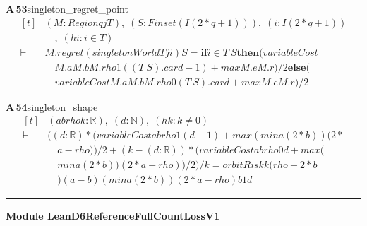 \documentclass[conference]{IEEEtran}
\theoremstyle{definition}
\newcommand{\lean}[1]{\textsf{\footnotesize #1}}
\begin{document}
\noindent\textbf{A\,53}\quad\lean{singleton\_regret\_point}
{\footnotesize\[ \begin{aligned}[t]
&(\mathit{M} : \mathit{Region} \mathit{q} \mathit{j} \mathit{T}),\; (\mathit{S} : \mathit{Finset} (\mathit{I} (2*\mathit{q}+1))),\; (\mathit{i} : \mathit{I} (2*\mathit{q}+1))\\
&\quad ,\; (\mathit{hi} : \mathit{i} \in \mathit{T})\\
\vdash\;&\mathit{M}.\mathit{regret} (\mathit{singletonWorld} \mathit{T} \mathit{j} \mathit{i}) \mathit{S} = \mathbf{if} \mathit{i} \in \mathit{T} \ \mathit{S} \mathbf{then} (\mathit{variableCost}\\
&\quad \mathit{M}.\mathit{a} \mathit{M}.\mathit{b} \mathit{M}.\mathit{rho} 1 ((\mathit{T} \ \mathit{S}).\mathit{card}-1)+\mathit{max} \mathit{M}.\mathit{e} \mathit{M}.\mathit{r})/2 \mathbf{else} (\\
&\quad \mathit{variableCost} \mathit{M}.\mathit{a} \mathit{M}.\mathit{b} \mathit{M}.\mathit{rho} 0 (\mathit{T} \ \mathit{S}).\mathit{card}+\mathit{max} \mathit{M}.\mathit{e} \mathit{M}.\mathit{r})/2
\end{aligned} \]}

\noindent\textbf{A\,54}\quad\lean{singleton\_shape}
{\footnotesize\[ \begin{aligned}[t]
&(\mathit{a} \mathit{b} \mathit{rho} \mathit{k} : \mathbb{R} ),\; (\mathit{d} : \mathbb{N} ),\; (\mathit{hk} : \mathit{k} \neq 0)\\
\vdash\;&((\mathit{d}:\mathbb{R} )*(\mathit{variableCost} \mathit{a} \mathit{b} \mathit{rho} 1 (\mathit{d}-1)+\mathit{max} (\mathit{min} \mathit{a} (2*\mathit{b})) (2*\\
&\quad \mathit{a}-\mathit{rho}))/2+ (\mathit{k}-(\mathit{d}:\mathbb{R} ))*(\mathit{variableCost} \mathit{a} \mathit{b} \mathit{rho} 0 \mathit{d}+\mathit{max} (\\
&\quad \mathit{min} \mathit{a} (2*\mathit{b})) (2*\mathit{a}-\mathit{rho}))/2)/\mathit{k} = \mathit{orbitRisk} \mathit{k} (\mathit{rho}-2*\mathit{b}\\
&\quad ) (\mathit{a}-\mathit{b}) (\mathit{min} \mathit{a} (2*\mathit{b})) (2*\mathit{a}-\mathit{rho}) \mathit{b} 1 \mathit{d}
\end{aligned} \]}

\vspace{4pt}\noindent\rule{\columnwidth}{0.4pt}\par\vspace{2pt}
\noindent\textbf{Module \lean{LeanD6ReferenceFullCountLossV1}}\par\vspace{3pt}
\end{document}
